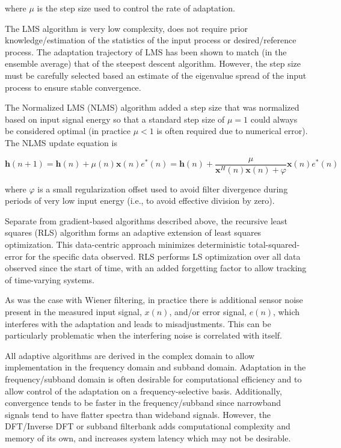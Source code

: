 \noindent
where $\mu$ is the step size used to control the rate of adaptation. 

The LMS algorithm is very low complexity, does not require prior knowledge/estimation of the statistics of the input process or desired/reference process. The adaptation trajectory of LMS has been shown to match (in the ensemble average) that of the steepest descent algorithm. However, the step size must be carefully selected based an estimate of the eigenvalue spread of the input process to ensure stable convergence.

The Normalized LMS (NLMS) algorithm added a step size that was normalized based on input signal energy so that a standard step size of $\mu=1$ could always be considered optimal (in practice $\mu < 1$ is often required due to numerical error). The NLMS update equation is

\begin{equation}
	\boldsymbol{h}(n+1) =
	\boldsymbol{h}(n) + \mu (n)\boldsymbol{x}(n)e^*(n) = 
	\boldsymbol{h}(n) + \frac{\mu}{\boldsymbol{x}^H(n)\boldsymbol{x}(n) + \varphi} \boldsymbol{x}(n)e^*(n)
\end{equation}

\noindent
where $\varphi$ is a small regularization offset used to avoid filter divergence during periods of very low input energy (i.e., to avoid effective division by zero).

Separate from gradient-based algorithms described above, the recursive least squares (RLS) algorithm forms an adaptive extension of least squares optimization. This data-centric approach minimizes deterministic total-squared-error for the specific data observed. RLS performs LS optimization over all data observed since the start of time, with an added forgetting factor to allow tracking of time-varying systems.

As was the case with Wiener filtering, in practice there is additional sensor noise present in the measured input signal, $x(n)$, and/or error signal, $e(n)$, which interferes with the adaptation and leads to misadjustments. This can be particularly problematic when the interfering noise is correlated with itself.

All adaptive algorithms are derived in the complex domain to allow implementation in the frequency domain and subband domain. Adaptation in the frequency/subband domain is often desirable for computational efficiency and to allow control of the adaptation on a frequency-selective basis. Additionally, convergence tends to be faster in the frequency/subband since narrowband signals tend to have flatter spectra than wideband signals. However, the DFT/Inverse DFT or subband filterbank adds computational complexity and memory of its own, and increases system latency which may not be desirable.



